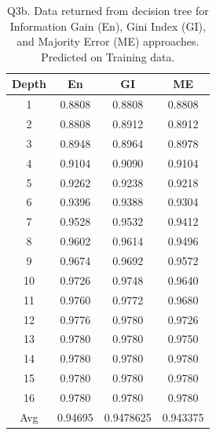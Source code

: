 \documentclass[12pt, fullpage,letterpaper]{article}
\begin{document}
\begin{table}[h]
    	\centering
    	\begin{tabular}{c|ccc}
    		Depth & En & GI & ME \\ 
    		\hline\hline
    		1 &  0.8808 & 0.8808 & 0.8808 \\ \hline
    		2 &  0.8808 & 0.8912 & 0.8912 \\ \hline
    		3 &  0.8948 & 0.8964 & 0.8978 \\ \hline
    		4 &  0.9104 & 0.9090 & 0.9104 \\ \hline
            5 &  0.9262 & 0.9238 & 0.9218 \\ \hline
            6 &  0.9396 & 0.9388 & 0.9304 \\ \hline
            7 &  0.9528 & 0.9532 & 0.9412 \\ \hline
            8 &  0.9602 & 0.9614 & 0.9496 \\ \hline
            9 &  0.9674 & 0.9692 & 0.9572 \\ \hline
            10 & 0.9726 & 0.9748 & 0.9640 \\ \hline
            11 & 0.9760 & 0.9772 & 0.9680 \\ \hline
            12 & 0.9776 & 0.9780 & 0.9726 \\ \hline
            13 & 0.9780 & 0.9780 & 0.9750 \\ \hline
            14 & 0.9780 & 0.9780 & 0.9780 \\ \hline
            15 & 0.9780 & 0.9780 & 0.9780 \\ \hline
            16 & 0.9780 & 0.9780 & 0.9780 \\ \hline
            \hline
            Avg & 0.94695 & 0.9478625 & 0.943375

    	\end{tabular}
    	\caption{Q3b. Data returned from decision tree for Information Gain (En), Gini Index (GI), and Majority Error (ME) approaches. Predicted on Training data.}
    \end{table}
    
\end{document}
